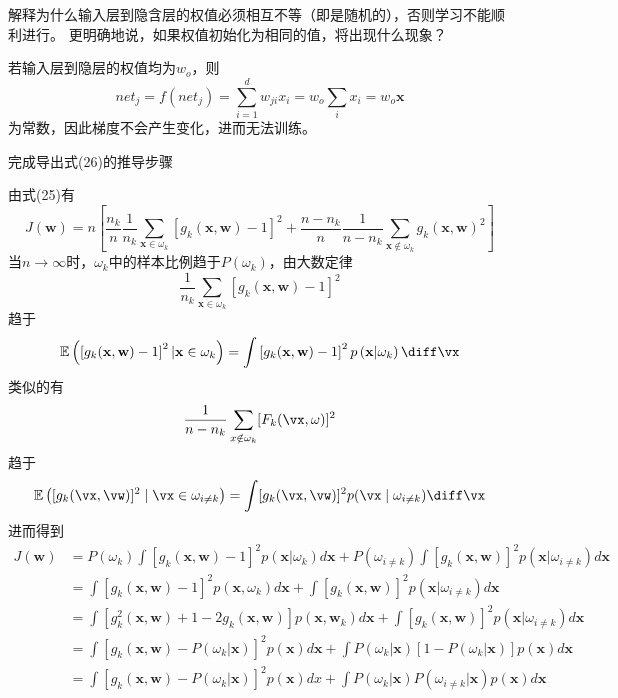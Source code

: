 \documentclass[reportComp]{thesis}
\begin{document}
\begin{question}[\textsection 6 Q12]
解释为什么输入层到隐含层的权值必须相互不等（即是随机的），否则学习不能顺利进行。
更明确地说，如果权值初始化为相同的值，将出现什么现象？
\end{question}
\begin{answer}
若输入层到隐层的权值均为$w_o$，则
\[net_{j}=f\left(net_{j}\right)=\sum_{i=1}^{d} w_{ji} x_{i}=w_{o} \sum_{i} x_{i}=w_{o} \mathbf{x}\]
为常数，因此梯度不会产生变化，进而无法训练。
\end{answer}

\begin{question}[\textsection 6 Q17]
完成导出式(26)的推导步骤
\end{question}
\begin{answer}
由式(25)有
\[J(\mathbf{w})=n\left[\frac{n_{k}}{n} \frac{1}{n_{k}} \sum_{\mathbf{x} \in \omega_{k}}\left[g_{k}(\mathbf{x}, \mathbf{w})-1\right]^{2}+\frac{n-n_{k}}{n} \frac{1}{n-n_{k}} \sum_{\mathbf{x} \notin\omega_{k}} g_{k}(\mathbf{x}, \mathbf{w})^{2}\right]\]
当$n\to\infty$时，$\omega_k$中的样本比例趋于$P(\omega_k)$，由大数定律
\[\frac{1}{n_{k}} \sum_{\mathbf{x} \in \omega_{k}}\left[g_{k}(\mathbf{x}, \mathbf{w})-1\right]^{2}\]
趋于
\[\mathbb{E}\left(\left[g_{k}(\mathbf{x}, \mathbf{w})-1\right]^{2} | \mathbf{x} \in \omega_{k}\right)=
\int\left[g_{k}(\mathbf{x}, \mathbf{w})-1\right]^{2} p\left(\mathbf{x} | \omega_{k}\right) \diff \vx\]
类似的有
\[\frac{1}{n-n_k}\sum_{x\notin \omega_k}[F_k(\vx,\omega)]^2\]
趋于
\[\mathbb{E}\left([g_k(\vx,\vw)]^2\mid\vx\in\omega_{i\ne k}\right)
=\int[g_k(\vx,\vw)]^2p(\vx\mid\omega_{i\ne k})\diff\vx\]
进而得到
\[\begin{aligned}
J(\mathbf{w}) &=P\left(\omega_{k}\right) \int\left[g_{k}(\mathbf{x}, \mathbf{w})-1\right]^{2} p\left(\mathbf{x} | \omega_{k}\right) d \mathbf{x}+P\left(\omega_{i \neq k}\right) \int\left[g_{k}(\mathbf{x}, \mathbf{w})\right]^{2} p\left(\mathbf{x} | \omega_{i \neq k}\right) d \mathbf{x} \\
&=\int\left[g_{k}(\mathbf{x}, \mathbf{w})-1\right]^{2} p\left(\mathbf{x}, \omega_{k}\right) d \mathbf{x}+\int\left[g_{k}(\mathbf{x}, \mathbf{w})\right]^{2} p\left(\mathbf{x} | \omega_{i \neq k}\right) d \mathbf{x} \\
&=\int\left[g_{k}^{2}(\mathbf{x}, \mathbf{w})+1-2 g_{k}(\mathbf{x}, \mathbf{w})\right] p\left(\mathbf{x}, \mathbf{w}_{k}\right) d \mathbf{x}+\int\left[g_{k}(\mathbf{x}, \mathbf{w})\right]^{2} p\left(\mathbf{x} | \omega_{i \neq k}\right) d \mathbf{x} \\
&=\int\left[g_{k}(\mathbf{x}, \mathbf{w})-P\left(\omega_{k} | \mathbf{x}\right)\right]^{2} p(\mathbf{x}) d \mathbf{x}+\int P\left(\omega_{k} | \mathbf{x}\right)\left[1-P\left(\omega_{k} | \mathbf{x}\right)\right] p(\mathbf{x}) d \mathbf{x} \\
&=\int\left[g_{k}(\mathbf{x}, \mathbf{w})-P\left(\omega_{k} | \mathbf{x}\right)\right]^{2} p(\mathbf{x}) d x+\int P\left(\omega_{k} | \mathbf{x}\right) P\left(\omega_{i \neq k} | \mathbf{x}\right) p(\mathbf{x}) d \mathbf{x}
\end{aligned}\]
\end{answer}
\end{document}
